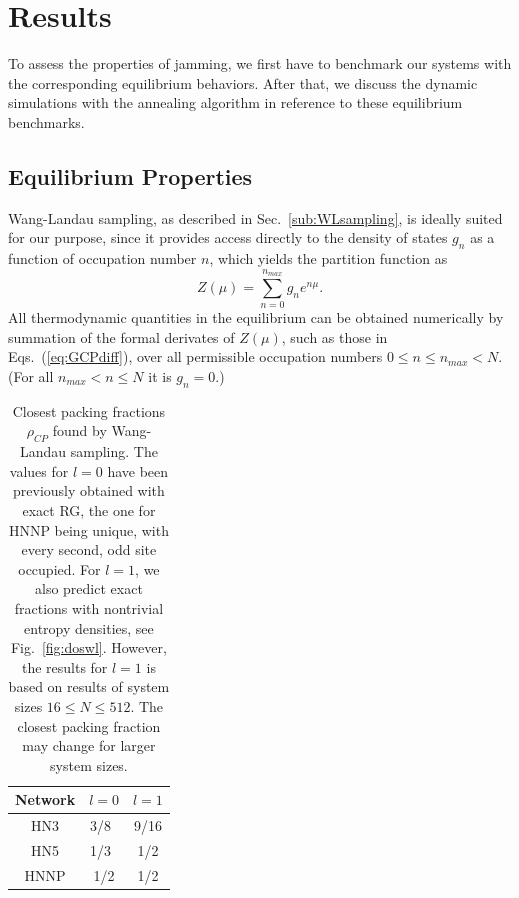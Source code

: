 \section{Results}
\label{sec:jam_results} 
To assess the properties of jamming, we first
have to benchmark our systems with the corresponding equilibrium behaviors.
After that, we discuss the dynamic simulations with the annealing
algorithm in reference to these equilibrium benchmarks.


\subsection{Equilibrium Properties\label{sub:Equilibrium-PropertiesWang-Landa}}

Wang-Landau sampling, as described in Sec.~\ref{sub:WLsampling},
is ideally suited for our purpose, since it provides access directly
to the density of states $g_{n}$ as a function of occupation number
$n$, which yields the partition function as
\begin{equation}
Z(\mu)=\sum_{n=0}^{n_{max}}g_{n}e^{n\mu}.\label{eq:Zmu}
\end{equation}
All thermodynamic quantities in the equilibrium can be obtained numerically
by summation of the formal derivates of $Z(\mu)$, such as those in
Eqs.~(\ref{eq:GCPdiff}), over all permissible occupation numbers
$0\leq n\leq n_{max}<N$. (For all $n_{max}<n\leq N$ it is $g_{n}=0$.) 


\begin{table}
\begin{centering}
\protect\caption{\label{tab:cpf} Closest packing fractions $\rho_{CP}$ found by Wang-Landau sampling. The values for $l=0$ have been previously obtained with exact RG,
the one for HNNP being unique, with every second, odd site occupied.
For $l=1$, we also predict exact fractions with nontrivial entropy
densities, see Fig.~\ref{fig:doswl}. However, the results for $l=1$ is based on results of system sizes $16\le N \le 512$. The closest packing fraction may change for larger system sizes.}
\par\end{centering}
\begin{centering}
\par\end{centering}
\centering{}%
\begin{tabular}{|c|c||c|}
\hline 
Network & $l=0$  & $l=1$ \tabularnewline
\hline 
\hline 
HN3  & 3/8~\cite{BoHa11} & 9/16 \tabularnewline
\hline 
HN5  & 1/3~\cite{BoHa11} & 1/2 \tabularnewline
\hline 
HNNP  & 1/2  & 1/2 \tabularnewline
\hline 
\end{tabular}
\end{table}


